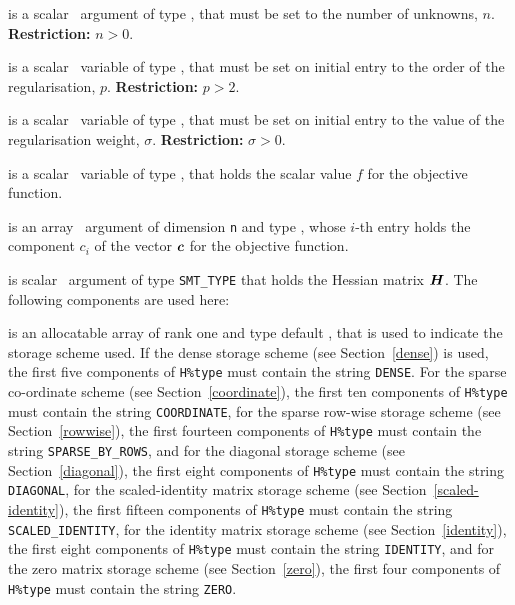 \documentclass{galahad}
\begin{document}
\begin{description}

 is a scalar \intentin\ argument of type \integer, that must be
set to the number of unknowns, $n$. {\bf Restriction: } $n  >  0$.

 is a scalar \intentin\ variable of type \realdp,
that must be set on initial entry
to the order of the regularisation, $p$.
{\bf Restriction: } $p > 2$.

 is a scalar \intentin\ variable of type \realdp,
that must be set on initial entry
to the value of the regularisation weight, $\sigma$.
{\bf Restriction: } $\sigma > 0$.

 is a scalar \intentin\ variable of type \realdp, that holds
the scalar value $f$ for the objective function.

 is an array \intentin\ argument of dimension {\tt n} and
type \realdp,  whose $i$-th entry holds the component $c_i$ of
the vector ${\bm{c}}$ for the objective function.

 is scalar \intentin\ argument of type {\tt SMT\_TYPE}
that holds the Hessian matrix ${\bm{H}}$. The following components
are used here:

\begin{description}

 is an allocatable array of rank one and type default
\character, that
is used to indicate the storage scheme used. If the dense storage scheme
(see Section~\ref{dense}) is used,
the first five components of {\tt H\%type} must contain the
string {\tt DENSE}.
For the sparse co-ordinate scheme (see Section~\ref{coordinate}),
the first ten components of {\tt H\%type} must contain the
string {\tt COORDINATE},
for the sparse row-wise storage scheme (see Section~\ref{rowwise}),
the first fourteen components of {\tt H\%type} must contain the
string {\tt SPARSE\_BY\_ROWS},
and for the diagonal storage scheme (see Section~\ref{diagonal}),
the first eight components of {\tt H\%type} must contain the
string {\tt DIAGONAL},
for the scaled-identity matrix storage scheme
(see Section~\ref{scaled-identity}),
the first fifteen components of {\tt H\%type} must contain the
string {\tt SCALED\_IDENTITY},
for the identity matrix storage scheme
(see Section~\ref{identity}),
the first eight components of {\tt H\%type} must contain the
string {\tt IDENTITY}, and
for the zero matrix storage scheme
(see Section~\ref{zero}),
the first four components of {\tt H\%type} must contain the
string {\tt ZERO}.


\end{description}
\end{description}
\end{document}
